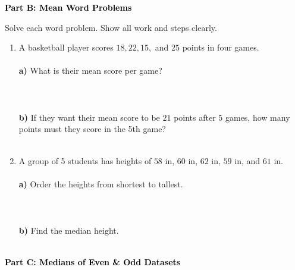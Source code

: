 \documentclass[12pt, letterpaper, fleqn]{article}
\newcommand{\blanklong}{\underline{\hspace{6.5cm}}}
\begin{document}
\newpage

\begin{tcolorbox}[colback=black!10]
    \large\textcolor{black}{\textbf{Part B: Mean Word Problems}}
\end{tcolorbox}

\vspace{3mm}

\noindent
Solve each word problem. Show all work and steps clearly.

\vspace{5mm}

\begin{enumerate}[itemsep=2.5cm, leftmargin=0.6cm]
\item A basketball player scores $18, 22, 15,$ and $25$ points in four games. \\ \\
\textbf{a)} What is their mean score per game? \\ \\
\blanklong \\ \\
\textbf{b)} If they want their mean score to be $21$ points after 5 games, how many points must they score in the 5th game? \\ \\
\blanklong

\item A group of 5 students has heights of $58$ in, $60$ in, $62$ in, $59$ in, and $61$ in. \\ \\
\textbf{a)} Order the heights from shortest to tallest. \\ \\
\blanklong \\ \\ 
\textbf{b)} Find the median height. \\ \\
\blanklong
\end{enumerate}

\newpage

\begin{tcolorbox}[colback=black!10]
    \large\textcolor{black}{\textbf{Part C: Medians of Even \& Odd Datasets}}
\end{tcolorbox}
\end{document}
